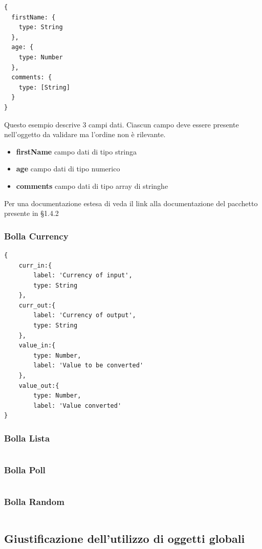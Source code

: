 \begin{lstlisting}
{
  firstName: {
    type: String
  },
  age: {
    type: Number
  },
  comments: {
    type: [String]
  }
}
\end{lstlisting}

Questo esempio descrive 3 campi dati. Ciascun campo deve essere
presente nell'oggetto da validare ma l'ordine non è rilevante.
\begin{itemize}
\item \textbf{firstName} campo dati di tipo stringa
\item \textbf{age} campo dati di tipo numerico
\item \textbf{comments} campo dati di tipo array di stringhe
\end{itemize}
Per una documentazione estesa di veda il link alla documentazione del
pacchetto presente in \S 1.4.2

\subsubsection{Bolla Currency}
\begin{lstlisting}
{
	curr_in:{
		label: 'Currency of input',
		type: String
	},
	curr_out:{
		label: 'Currency of output',
		type: String
	},
	value_in:{
		type: Number,
		label: 'Value to be converted'
	},
	value_out:{
		type: Number,
		label: 'Value converted'
}
\end{lstlisting}

\subsubsection{Bolla Lista}
\begin{lstlisting}
\end{lstlisting}

\subsubsection{Bolla Poll}
\begin{lstlisting}
\end{lstlisting}

\subsubsection{Bolla Random}
\begin{lstlisting}
\end{lstlisting}

\subsection{Giustificazione dell'utilizzo di oggetti globali}

